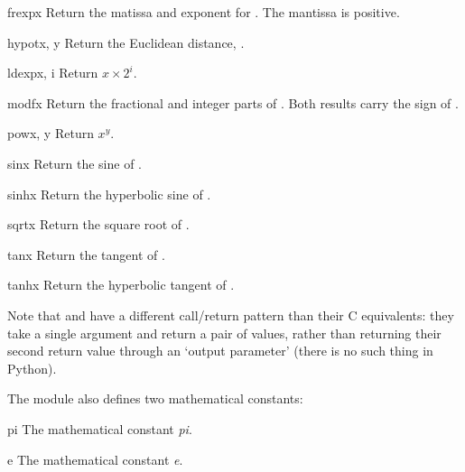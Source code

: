 \begin{funcdesc}{frexp}{x}
Return the matissa and exponent for .  The mantissa is
positive.
\end{funcdesc}

\begin{funcdesc}{hypot}{x, y}
Return the Euclidean distance, .
\end{funcdesc}

\begin{funcdesc}{ldexp}{x, i}
Return $x {\times} 2^i$.
\end{funcdesc}

\begin{funcdesc}{modf}{x}
Return the fractional and integer parts of .  Both results
carry the sign of .
\end{funcdesc}

\begin{funcdesc}{pow}{x, y}
Return $x^y$.
\end{funcdesc}

\begin{funcdesc}{sin}{x}
Return the sine of .
\end{funcdesc}

\begin{funcdesc}{sinh}{x}
Return the hyperbolic sine of .
\end{funcdesc}

\begin{funcdesc}{sqrt}{x}
Return the square root of .
\end{funcdesc}

\begin{funcdesc}{tan}{x}
Return the tangent of .
\end{funcdesc}

\begin{funcdesc}{tanh}{x}
Return the hyperbolic tangent of .
\end{funcdesc}

Note that  and  have a different call/return
pattern than their C equivalents: they take a single argument and
return a pair of values, rather than returning their second return
value through an `output parameter' (there is no such thing in Python).

The module also defines two mathematical constants:

\begin{datadesc}{pi}
The mathematical constant \emph{pi}.
\end{datadesc}

\begin{datadesc}{e}
The mathematical constant \emph{e}.
\end{datadesc}

\begin{seealso}
\end{seealso}
